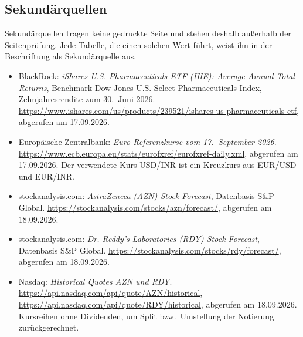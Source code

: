 \subsection*{Sekund\"arquellen}

Sekund\"arquellen tragen keine gedruckte Seite und stehen deshalb
au{\ss}erhalb der Seitenpr\"ufung. Jede Tabelle, die einen solchen Wert
f\"uhrt, weist ihn in der Beschriftung als Sekund\"arquelle aus.

\begin{itemize}
\item \label{quelle:huerde} BlackRock: \emph{iShares U.S. Pharmaceuticals ETF
(IHE): Average Annual Total Returns}, Benchmark Dow Jones U.S. Select
Pharmaceuticals Index, Zehnjahresrendite zum 30.~Juni 2026.
\url{https://www.ishares.com/us/products/239521/ishares-us-pharmaceuticals-etf},
abgerufen am 17.09.2026.
\item \label{quelle:ezb} Europ\"aische Zentralbank: \emph{Euro-Referenzkurse
vom 17.~September 2026}.
\url{https://www.ecb.europa.eu/stats/eurofxref/eurofxref-daily.xml},
abgerufen am 17.09.2026. Der verwendete Kurs USD/INR ist ein Kreuzkurs aus
EUR/USD und EUR/INR.
\item \label{quelle:konsensazn} stockanalysis.com: \emph{AstraZeneca (AZN)
Stock Forecast}, Datenbasis S\&P Global.
\url{https://stockanalysis.com/stocks/azn/forecast/}, abgerufen am 18.09.2026.
\item \label{quelle:konsensrdy} stockanalysis.com: \emph{Dr. Reddy's
Laboratories (RDY) Stock Forecast}, Datenbasis S\&P Global.
\url{https://stockanalysis.com/stocks/rdy/forecast/}, abgerufen am 18.09.2026.
\item \label{quelle:nasdaq} Nasdaq: \emph{Historical Quotes AZN und RDY}.
\url{https://api.nasdaq.com/api/quote/AZN/historical},
\url{https://api.nasdaq.com/api/quote/RDY/historical}, abgerufen am
18.09.2026. Kursreihen ohne Dividenden, um Split bzw.\ Umstellung der
Notierung zur\"uckgerechnet.
\end{itemize}
